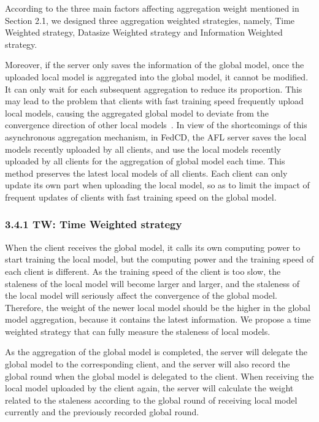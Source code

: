 \documentclass[twoside,twocolumn]{article}
\begin{document}
\begin{spacing}{1.0}
	According to the three main factors affecting aggregation weight mentioned in Section 2.1, we designed three aggregation weighted strategies, namely, Time Weighted strategy, Datasize Weighted strategy and Information Weighted strategy.
	
	Moreover, if the server only saves the information of the global model, once the uploaded local model is aggregated into the global model, it cannot be modified. It can only wait for each subsequent aggregation to reduce its proportion. This may lead to the problem that clients with fast training speed frequently upload local models, causing the aggregated global model to deviate from the convergence direction of other local models~\cite{chen2021asynchronous}. In view of the shortcomings of this asynchronous aggregation mechanism, in FedCD, the AFL server saves the local models recently uploaded by all clients, and use the local models recently uploaded by all clients for the aggregation of global model each time. This method preserves the latest local models of all clients. Each client can only update its own part when uploading the local model, so as to limit the impact of frequent updates of clients with fast training speed on the global model.

\subsubsection{3.4.1 TW: Time Weighted strategy} When the client receives the global model, it calls its own computing power to start training the local model, but the computing power and the training speed of each client is different. As the training speed of the client is too slow, the staleness of the local model will become larger and larger, and the staleness of the local model will seriously affect the convergence of the global model. Therefore, the weight of the newer local model should be the higher in the global model aggregation, because it contains the latest information. We propose a time weighted strategy that can fully measure the staleness of local models.

	As the aggregation of the global model is completed, the server will delegate the global model to the corresponding client, and the server will also record the global round when the global model is delegated to the client. When receiving the local model uploaded by the client again, the server will calculate the weight related to the staleness according to the global round of receiving local model currently and the previously recorded global round.


\end{spacing}
\end{document}
